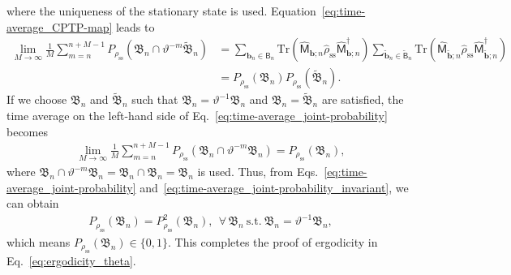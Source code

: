 \documentclass[preprint,pteplogo]{ptephy_v2}%
\numberwithin{equation}{section}
\theoremstyle{definition}
\begin{document}
where the uniqueness of the stationary state is used. 
Equation~\eqref{eq:time-average_CPTP-map} leads to
\begin{align}
    \lim_{M\rightarrow\infty}\frac{1}{M}\sum_{m=n}^{n+M-1}P_{\rho_\mathrm{ss}}\left(\mathfrak{B}_n\cap\vartheta^{-m}\tilde{\mathfrak{B}}_n\right)
    &=\sum_{\bm{b}_n \in \mathsf{B}_n}\mathrm{Tr}
    \left(\hat{\mathsf{M}}_{\bm{b};n}\hat{\rho}_\mathrm{ss}
    \hat{\mathsf{M}}_{\bm{b};n}^\dagger\right)
    \sum_{\tilde{\bm{b}}_n \in \tilde{\mathsf{B}}_n}\mathrm{Tr}
    \left(\hat{\mathsf{M}}_{\tilde{\bm{b}};n}\hat{\rho}_\mathrm{ss}
    \hat{\mathsf{M}}^\dagger_{\tilde{\bm{b}};n}\right)\nonumber\\
    &=P_{\rho_\mathrm{ss}}\left(\mathfrak{B}_n\right)
    P_{\rho_\mathrm{ss}}\left(\tilde{\mathfrak{B}}_n\right).
    \label{eq:time-average_joint-probability}
\end{align}
If we choose $\mathfrak{B}_n$ and $\tilde{\mathfrak{B}}_n$ such that $\mathfrak{B}_n=\vartheta^{-1}\mathfrak{B}_n$ and $\mathfrak{B}_n=\tilde{\mathfrak{B}}_n$ are satisfied, the time average on the left-hand side of Eq.~\eqref{eq:time-average_joint-probability} becomes 
\begin{align}
    \lim_{M\rightarrow\infty}\frac{1}{M}\sum_{m=n}^{n+M-1}
    P_{\rho_\mathrm{ss}}\left(\mathfrak{B}_n\cap\vartheta^{-m}\mathfrak{B}_n\right)
    =P_{\rho_\mathrm{ss}}\left(\mathfrak{B}_n\right),
    \label{eq:time-average_joint-probability_invariant}
\end{align}
where $\mathfrak{B}_n\cap\vartheta^{-m}\mathfrak{B}_n=\mathfrak{B}_n\cap\mathfrak{B}_n=\mathfrak{B}_n$ is used.
Thus, from Eqs.~\eqref{eq:time-average_joint-probability} and~\eqref{eq:time-average_joint-probability_invariant}, we can obtain 
\begin{align}
    P_{\rho_\mathrm{ss}}\left(\mathfrak{B}_n\right)
    =P_{\rho_\mathrm{ss}}^2\left(\mathfrak{B}_n\right),\ \ \forall \, \mathfrak{B}_n \ \mathrm{s.t.} \ \mathfrak{B}_n=\vartheta^{-1}\mathfrak{B}_n,
\end{align}
which means $P_{\rho_\mathrm{ss}}\left(\mathfrak{B}_n\right) \in \{ 0, 1\}$. This completes the proof of ergodicity in Eq.~\eqref{eq:ergodicity_theta}. 
\end{document}
